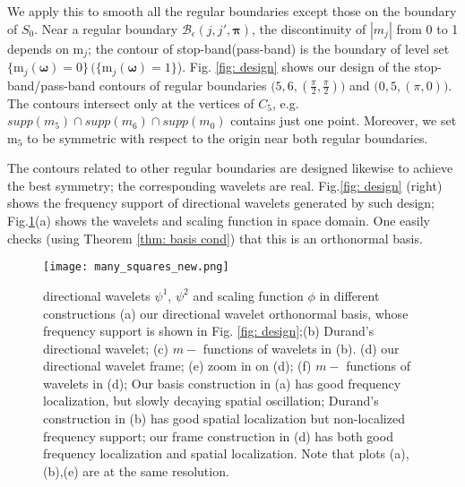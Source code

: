 We apply this to smooth all the regular boundaries except those on the boundary of $S_0$. Near a regular boundary $\mathcal{B}_{\epsilon}(j,j',\boldsymbol{\pi})$, the discontinuity of $|m_j|$ from 0 to 1 depends on $\mathrm{m}_j$; the contour of stop-band(pass-band) is the boundary of level set $\{\mathrm{m}_j(\boldsymbol{\omega}) = 0\}\,(\{\mathrm{m}_j(\boldsymbol{\omega}) = 1\}$). Fig. \ref{fig: design} shows our design of the stop-band/pass-band contours of regular boundaries {\small $\big(5,6,(\frac{\pi}{2},\frac{\pi}{2})\big)$} and {\small $\big(0,5,(\pi,0)\big)$}. The contours intersect only at the vertices of $C_5$, e.g. $supp(m_5)\cap supp(m_6)\cap supp(m_0)$ contains just one point. %
Moreover, we set $\mathrm{m}_5$ to be symmetric with respect to the origin near both regular boundaries. 

The contours related to other regular boundaries are designed likewise to achieve the best symmetry; the corresponding wavelets are real. Fig.\ref{fig: design} (right) shows the frequency support of directional wavelets generated by such design; Fig.\ref{fig: many-squares}(a) shows the wavelets and scaling function in space domain. One easily checks (using Theorem \ref{thm: basis cond}) that this is an orthonormal basis.

\begin{figure}[!t]
\centering
\hspace*{-5mm}\vspace*{-2mm}
\begin{minipage}[t]{\textwidth}
\texttt{[image: many\_squares\_new.png]}
\end{minipage}\hspace*{1mm}
\caption{ directional wavelets $\psi^1$, $\psi^2$ and scaling function $\phi$ in different constructions (a) our directional wavelet orthonormal basis, whose frequency support is shown in Fig. \ref{fig: design};(b) Durand's directional wavelet; (c) $m-$ functions of wavelets in (b). (d) our directional wavelet frame; (e) zoom in on (d); (f) $m-$ functions of wavelets in (d);  Our basis construction in (a) has good frequency localization, but slowly decaying spatial oscillation; Durand's construction in (b) has good spatial localization but non-localized frequency support; our frame construction in (d) has both good frequency localization and spatial localization. Note that plots (a),(b),(e) are at the same resolution.}
\label{fig: many-squares}
\vspace*{-3mm}
\end{figure}

